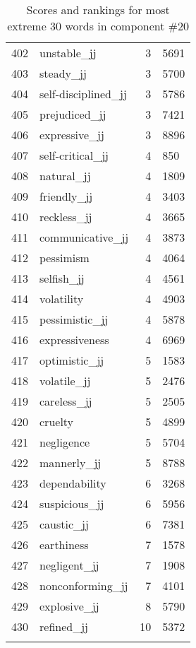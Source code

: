 \begin{longtable}[!htbp]{| rlr@{.}l |}
    402 & unstable\_jj & 3 & 5691 \\
    403 & steady\_jj & 3 & 5700 \\
    404 & self-disciplined\_jj & 3 & 5786 \\
    405 & prejudiced\_jj & 3 & 7421 \\
    406 & expressive\_jj & 3 & 8896 \\
    407 & self-critical\_jj & 4 & 850 \\
    408 & natural\_jj & 4 & 1809 \\
    409 & friendly\_jj & 4 & 3403 \\
    410 & reckless\_jj & 4 & 3665 \\
    411 & communicative\_jj & 4 & 3873 \\
    412 & pessimism & 4 & 4064 \\
    413 & selfish\_jj & 4 & 4561 \\
    414 & volatility & 4 & 4903 \\
    415 & pessimistic\_jj & 4 & 5878 \\
    416 & expressiveness & 4 & 6969 \\
    417 & optimistic\_jj & 5 & 1583 \\
    418 & volatile\_jj & 5 & 2476 \\
    419 & careless\_jj & 5 & 2505 \\
    420 & cruelty & 5 & 4899 \\
    421 & negligence & 5 & 5704 \\
    422 & mannerly\_jj & 5 & 8788 \\
    423 & dependability & 6 & 3268 \\
    424 & suspicious\_jj & 6 & 5956 \\
    425 & caustic\_jj & 6 & 7381 \\
    426 & earthiness & 7 & 1578 \\
    427 & negligent\_jj & 7 & 1908 \\
    428 & nonconforming\_jj & 7 & 4101 \\
    429 & explosive\_jj & 8 & 5790 \\
    430 & refined\_jj & 10 & 5372 \\
    \hline
    \caption{Scores and rankings for most extreme 30 words in component \#20} \\
\end{longtable}
